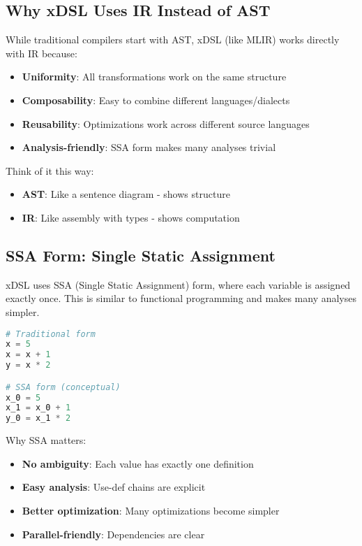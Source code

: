 \documentclass[11pt,a4paper]{article}
\begin{document}
\subsection{Why xDSL Uses IR Instead of AST}

While traditional compilers start with AST, xDSL (like MLIR) works directly with IR because:
\begin{itemize}
    \item \textbf{Uniformity}: All transformations work on the same structure
    \item \textbf{Composability}: Easy to combine different languages/dialects
    \item \textbf{Reusability}: Optimizations work across different source languages
    \item \textbf{Analysis-friendly}: SSA form makes many analyses trivial
\end{itemize}

Think of it this way:
\begin{itemize}
    \item \textbf{AST}: Like a sentence diagram - shows structure
    \item \textbf{IR}: Like assembly with types - shows computation
\end{itemize}

\subsection{SSA Form: Single Static Assignment}

xDSL uses SSA (Single Static Assignment) form, where each variable is assigned exactly once. This is similar to functional programming and makes many analyses simpler.

\begin{lstlisting}[language=Python, caption=Traditional vs SSA Form]
# Traditional form
x = 5
x = x + 1
y = x * 2

# SSA form (conceptual)
x_0 = 5
x_1 = x_0 + 1
y_0 = x_1 * 2
\end{lstlisting}

Why SSA matters:
\begin{itemize}
    \item \textbf{No ambiguity}: Each value has exactly one definition
    \item \textbf{Easy analysis}: Use-def chains are explicit
    \item \textbf{Better optimization}: Many optimizations become simpler
    \item \textbf{Parallel-friendly}: Dependencies are clear
\end{itemize}
\end{document}
